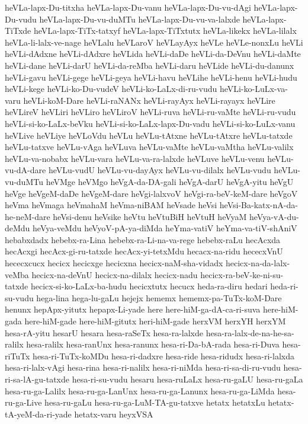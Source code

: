 {heVLa-lapx-Du-titxha
heVLa-lapx-Du-vanu
heVLa-lapx-Du-vu-dAgi
heVLa-lapx-Du-vudu
heVLa-lapx-Du-vu-duMTu
heVLa-lapx-Du-vu-va-lalxde
heVLa-lapx-TiTxde
heVLa-lapx-TiTx-tatxyf
heVLa-lapx-TiTxtutx
heVLa-likekx
heVLa-lilalx
heVLa-li-lalx-ve-nage
heVLalu
heVLaroV
heVLayAyx
heVLe
heVLe-nonxLu
heVLi
heVLi-dAdxne
heVLi-dAdxre
heVLida
heVLi-daDe
heVLi-da-DeVnu
heVLi-daMte
heVLi-dane
heVLi-darU
heVLi-da-reMba
heVLi-daru
heVLide
heVLi-du-danunx
heVLi-gavu
heVLi-gege
heVLi-geya
heVLi-havu
heVLihe
heVLi-henu
heVLi-hudu
heVLi-kege
heVLi-ko-Du-vudeV
heVLi-ko-LaLx-di-ru-vudu
heVLi-ko-LuLx-va-varu
heVLi-koM-Dare
heVLi-raNANx
heVLi-rayAyx
heVLi-rayayx
heVLire
heVLireV
heVLiri
heVLiro
heVLiroV
heVLi-ruva
heVLi-ru-vaMte
heVLi-ru-vudu
heVLi-si-ko-LaLx-beVku
heVLi-si-ko-LaLx-lapx-Du-vadu
heVLi-si-ko-LuLx-vanu
heVLive
heVLiye
heVLoVdu
heVLu
heVLu-tAtxne
heVLu-tAtxre
heVLu-tatxde
heVLu-tatxve
heVLu-vAga
heVLuva
heVLu-vaMte
heVLu-vaMtha
heVLu-valilx
heVLu-va-nobabx
heVLu-vara
heVLu-va-ra-lalxde
heVLuve
heVLu-venu
heVLu-vu-dA-dare
heVLu-vudU
heVLu-vu-dayAyx
heVLu-vu-dilalx
heVLu-vudu
heVLu-vu-duMTu
heVMge
heVMgo
heVgA-da-DA-gali
heVgA-darU
heVgA-yitu
heVgU
heVge
heVgeM-daDe
heVgeM-dare
heVgi-lalxvoV
heVgi-ra-beV-keM-dare
heVgoV
heVma
heVmaga
heVmahaM
heVma-niBAM
heVsade
heVsi
heVsi-Ba-katx-nA-da-he-neM-dare
heVsi-denu
heVsike
heVtu
heVtuBiH
heVtuH
heVyaM
heVya-vA-du-deMdu
heVya-veMdu
heVyoV-pA-ya-diMda
heYma-vatiV
heYma-va-tiV-shAniV
hebabxdadx
hebebx-ra-Lina
hebebx-ra-Li-na-va-rege
hebebx-raLu
hecAcxda
hecAcxgi
hecAcx-gi-ru-tatxde
hecAcx-yi-tetxMdu
hecacx-na-ridu
hececxVnU
hececxcucx
hecicx
hecicxge
hecicxna
hecicx-naM-sha-vidadx
hecicx-na-da-lalx-veMba
hecicx-na-deVnU
hecicx-na-dilalx
hecicx-nadu
hecicx-ra-beV-ke-ni-su-tatxde
hecicx-si-ko-LaLx-ba-hudu
hecicxtutx
hecucx
heda-ra-diru
hedari
heda-ri-su-vudu
hega-lina
hega-lu-gaLu
hejejx
hememx
hememx-pa-TuTx-koM-Dare
henunx
hepApx-yitutx
hepapx-Li-yade
here
here-hiM-ga-dA-ca-ri-suva
here-hiM-gada
here-hiM-gade
here-hiM-gitutx
heri-hiM-gade
herxVM
herxYH
herxYM
hesa-rA-yitu
hesarU
hesara
hesa-raSeTx
hesa-ra-lalxde
hesa-ra-lalx-de-na-he-sa-ralilx
hesa-ralilx
hesa-ranUnx
hesa-ranunx
hesa-ri-Da-bA-rada
hesa-ri-Duva
hesa-riTuTx
hesa-ri-TuTx-koMDu
hesa-ri-dadxre
hesa-ride
hesa-ridudx
hesa-ri-lalxda
hesa-ri-lalx-vAgi
hesa-rina
hesa-ri-nalilx
hesa-ri-niMda
hesa-ri-sa-di-ru-vudu
hesa-ri-sa-lA-gu-tatxde
hesa-ri-su-vudu
hesaru
hesa-ruLaLx
hesa-ru-gaLU
hesa-ru-gaLa
hesa-ru-ga-Lalilx
hesa-ru-ga-LanUnx
hesa-ru-ga-Lanunx
hesa-ru-ga-LiMda
hesa-ru-ga-Live
hesa-ru-gaLu
hesa-ru-ga-LuM-TA-gu-tatxve
hetatx
hetatxLu
hetatx-tA-yeM-da-ri-yade
hetatx-varu
heyxVSA
}

